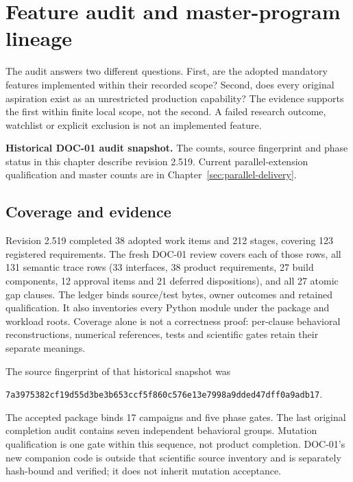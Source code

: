 \chapter{Feature audit and master-program lineage}
\label{sec:current-audit}

The audit answers two different questions. First, are the adopted mandatory
features implemented within their recorded scope? Second, does every original
aspiration exist as an unrestricted production capability? The evidence supports
the first within finite local scope, not the second. A failed research outcome,
watchlist or explicit exclusion is not an implemented feature.

\begin{decisions}
\textbf{Historical DOC-01 audit snapshot.} The counts, source fingerprint and
phase status in this chapter describe revision 2.519. Current parallel-extension
qualification and master counts are in Chapter~\ref{sec:parallel-delivery}.
\end{decisions}
\section{Coverage and evidence}

Revision 2.519 completed 38 adopted work items and 212 stages, covering 123
registered requirements. The fresh DOC-01 review covers each of those rows,
all 131 semantic trace rows (33 interfaces, 38 product requirements, 27 build
components, 12 approval items and 21 deferred dispositions), and all 27 atomic
gap clauses. The ledger binds source/test bytes, owner outcomes and retained
qualification. It also inventories every Python module under the package and
workload roots. Coverage alone is not a correctness proof: per-clause behavioral
reconstructions, numerical references, tests and scientific gates retain their
separate meanings.

The source fingerprint of that historical snapshot was
\begin{center}\small
\texttt{7a3975382cf19d55d3be3b653ccf5f860c576e13e7998a9dded47dff0a9adb17}.
\end{center}
The accepted package binds 17 campaigns and five phase gates. The last original
completion audit contains seven independent behavioral groups. Mutation
qualification is one gate within this sequence, not product completion.
DOC-01's new companion code is outside that scientific source inventory and
is separately hash-bound and verified; it does not inherit mutation acceptance.


